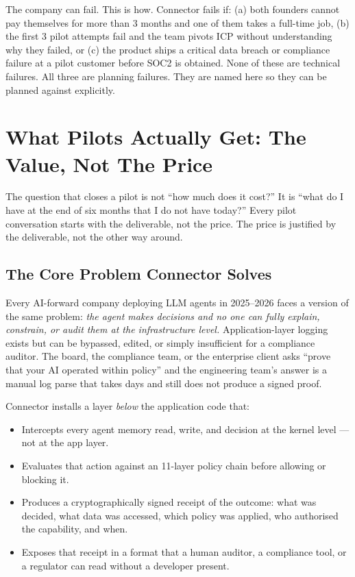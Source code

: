 \begin{warnbox}{The company can fail. This is how.}
Connector fails if: (a) both founders cannot pay themselves for more than
3 months and one of them takes a full-time job, (b) the first 3 pilot
attempts fail and the team pivots ICP without understanding why they
failed, or (c) the product ships a critical data breach or compliance
failure at a pilot customer before SOC2 is obtained. None of these are
technical failures. All three are planning failures. They are named here
so they can be planned against explicitly.
\end{warnbox}

\section*{What Pilots Actually Get: The Value, Not The Price}

The question that closes a pilot is not ``how much does it cost?'' It is
``what do I have at the end of six months that I do not have today?'' Every
pilot conversation starts with the deliverable, not the price. The price
is justified by the deliverable, not the other way around.

\subsection*{The Core Problem Connector Solves}

Every AI-forward company deploying LLM agents in 2025--2026 faces a version
of the same problem: \emph{the agent makes decisions and no one can fully
explain, constrain, or audit them at the infrastructure level.} Application-layer
logging exists but can be bypassed, edited, or simply insufficient for a
compliance auditor. The board, the compliance team, or the enterprise client
asks ``prove that your AI operated within policy'' and the engineering team's
answer is a manual log parse that takes days and still does not produce a
signed proof.

Connector installs a layer \emph{below} the application code that:

\begin{itemize}[leftmargin=1.5em, itemsep=3pt]
  \item Intercepts every agent memory read, write, and decision at the kernel
        level --- not at the app layer.
  \item Evaluates that action against an 11-layer policy chain before
        allowing or blocking it.
  \item Produces a cryptographically signed receipt of the outcome: what
        was decided, what data was accessed, which policy was applied, who
        authorised the capability, and when.
  \item Exposes that receipt in a format that a human auditor, a compliance
        tool, or a regulator can read without a developer present.
\end{itemize}

